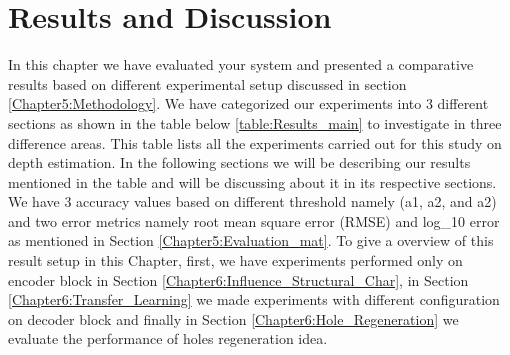 

\chapter{Results and Discussion}

\label{Chapter6:Results}

 
 
In this chapter we have evaluated your system and presented a comparative results  based on different experimental setup discussed in section \ref{Chapter5:Methodology}. We have categorized our experiments into 3 different sections as shown in the table below \ref{table:Results_main} to investigate in three difference areas. This table lists all the experiments carried out for this study on depth estimation. In the following sections we will be describing our results mentioned in the table and will be discussing about it in its respective sections.  We have 3 accuracy values based on different threshold namely (a1, a2, and a2) and two error metrics namely root mean square error (RMSE) and log\_10 error as mentioned in Section \ref{Chapter5:Evaluation_mat}. To give a overview of this result setup in this Chapter, first, we have experiments performed only on encoder block in Section \ref{Chapter6:Influence_Structural_Char}, in Section \ref{Chapter6:Transfer_Learning}  we made experiments with different configuration on decoder block and finally in Section \ref{Chapter6:Hole_Regeneration} we evaluate the performance of holes regeneration idea. 

